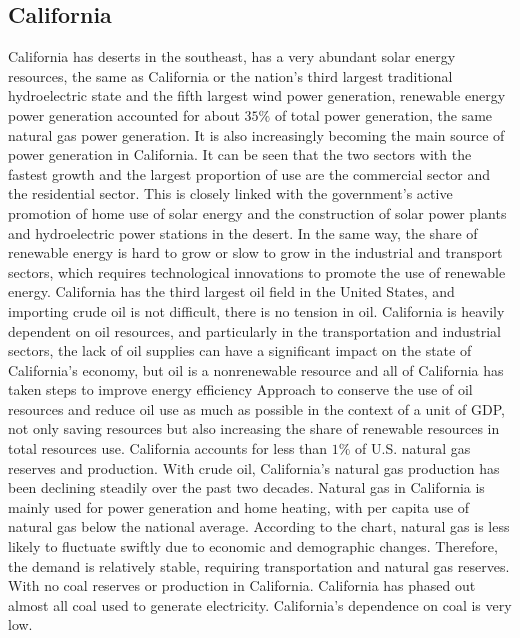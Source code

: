 \documentclass{mcmthesis}
\begin{document}
\subsection{California}
California has deserts in the southeast, has a very abundant solar energy resources,
the same as California or the nation's third largest traditional hydroelectric state and the fifth largest wind power generation,
renewable energy power generation accounted for about $35\%$ of total power generation, the same natural gas power generation.
It is also increasingly becoming the main source of power generation in California.
It can be seen that the two sectors with the fastest growth and the largest proportion of use are the commercial sector and the residential sector.
This is closely linked with the government's active promotion of home use of solar energy and the construction of solar power plants and hydroelectric power stations in the desert.
In the same way, the share of renewable energy is hard to grow or slow to grow in the industrial and transport sectors, which requires technological innovations to promote the use of renewable energy.
California has the third largest oil field in the United States, and importing crude oil is not difficult, there is no tension in oil.
California is heavily dependent on oil resources, and particularly in the transportation and industrial sectors, the lack of oil supplies can have a significant impact on the state of California's economy,
but oil is a nonrenewable resource and all of California has taken steps to improve energy efficiency Approach to conserve the use of oil resources and reduce oil use as much as possible in the context of a unit of GDP,
not only saving resources but also increasing the share of renewable resources in total resources use. California accounts for less than $1\%$ of U.S. natural gas reserves and production.
With crude oil, California's natural gas production has been declining steadily over the past two decades.
Natural gas in California is mainly used for power generation and home heating, with per capita use of natural gas below the national average.
According to the chart, natural gas is less likely to fluctuate swiftly due to economic and demographic changes.
Therefore, the demand is relatively stable, requiring transportation and natural gas reserves. With no coal reserves or production in California.
California has phased out almost all coal used to generate electricity. California's dependence on coal is very low.
\end{document}
